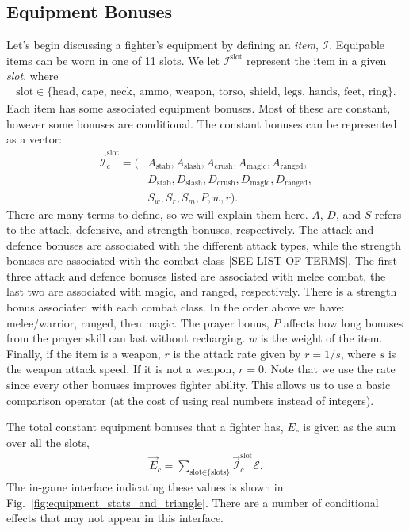 	\subsection{Equipment Bonuses}\label{sec:equipment_bonuses}
		Let's begin discussing a fighter's equipment by defining an \textit{item}, $\mathcal{I}$. Equipable items can be worn in one of 11 slots. We let $\mathcal{I}^\text{slot}$ represent the item in a given \textit{slot}, where
		\begin{align}
			\text{slot} \in \{\text{head, cape, neck, ammo, weapon, torso, shield, legs, hands, feet, ring}\}.
		\end{align}
		Each item has some associated equipment bonuses. Most of these are constant, however some bonuses are conditional. The constant bonuses can be represented as a vector:
		\begin{align}
			\vec{\mathcal{I}}^{\text{slot}}_c = (
				&A_\text{stab}, A_\text{slash}, A_\text{crush}, A_\text{magic}, A_\text{ranged}, \\
				&D_\text{stab}, D_\text{slash}, D_\text{crush}, D_\text{magic}, D_\text{ranged}, \\
				&S_w, S_r, S_m, P, w, r).
		\end{align}
		There are many terms to define, so we will explain them here. $A$, $D$, and $S$ refers to the attack, defensive, and strength bonuses, respectively. The attack and defence bonuses are associated with the different attack types, while the strength bonuses are associated with the combat class [SEE LIST OF TERMS]. The first three attack and defence bonuses listed are associated with melee combat, the last two are associated with magic, and ranged, respectively. There is a strength bonus associated with each combat class. In the order above we have: melee/warrior, ranged, then magic. The prayer bonus, $P$ affects how long bonuses from the prayer skill can last without recharging. $w$ is the weight of the item. Finally, if the item is a weapon, $r$ is the attack rate given by $r=1/s$, where $s$ is the weapon attack speed. If it is not a weapon, $r=0$. Note that we use the rate since every other bonuses improves fighter ability. This allows us to use a basic comparison operator (at the cost of using real numbers instead of integers).

		The total constant equipment bonuses that a fighter has, $E_c$ is given as the sum over all the slots,
		\begin{align}
			\vec{E}_c = \sum_\text{slot$\in$\{slots\}} \vec{\mathcal{I}}^\text{slot}_c \mathcal{E}.
		\end{align}
		The in-game interface indicating these values is shown in Fig.~\ref{fig:equipment_stats_and_triangle}. There are a number of conditional effects that may not appear in this interface.

